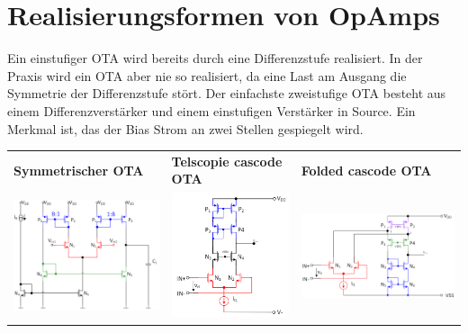 \section{Realisierungsformen von OpAmps}
Ein einstufiger OTA wird bereits durch eine Differenzstufe realisiert. In der Praxis wird ein OTA aber nie so realisiert, da eine Last am Ausgang die Symmetrie der Differenzstufe stört. Der einfachste zweistufige OTA besteht aus einem Differenzverstärker und einem einstufigen Verstärker in Source. Ein Merkmal ist, das der Bias Strom an zwei Stellen gespiegelt wird.\\
\begin{tabular}{l l l}
\textbf{Symmetrischer OTA} & \textbf{Telscopie cascode OTA} & \textbf{Folded cascode OTA}\\
\includegraphics[width=5cm]{Symetrischer OTA.png} & \includegraphics[width=4cm]{Telescopic cascode OTA.png} & \includegraphics[width=6cm]{Folded cascode OTA.png} \\
\end{tabular}\vspace{10pt}\\
\renewcommand{\arraystretch}{1.8}

